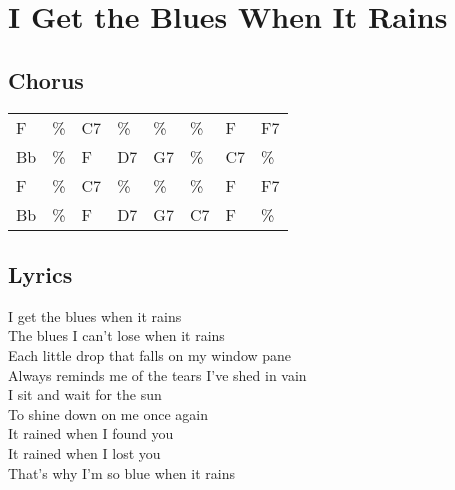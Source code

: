 \section{I Get the Blues When It Rains}


\subsection*{Chorus}


\begin{tabular}{l l l l l l l l}
F & \% & C7 & \% & \% & \% & F & F7 \\ 
Bb & \% & F & D7 & G7 & \% & C7 & \% \\ 
F & \% & C7 & \% & \% & \% & F & F7 \\ 
Bb & \% & F & D7 & G7 & C7 & F & \% \\ 
\end{tabular}


\subsection*{Lyrics}


I get the blues when it rains \\ 
The blues I can't lose when it rains \\ 
Each little drop that falls on my window pane \\ 
Always reminds me of the tears I've shed in vain \\ 

I sit and wait for the sun \\ 
To shine down on me once again \\ 
It rained when I found you \\ 
It rained when I lost you \\ 
That's why I'm so blue when it rains \\ 
